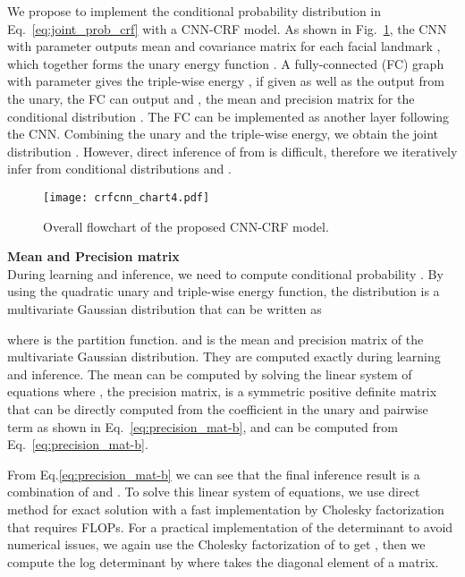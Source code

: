 \documentclass{article}
\begin{document}
We propose to implement the conditional probability distribution in Eq.~\eqref{eq:joint_prob_crf} with a CNN-CRF model. As shown in Fig.~\ref{fig:flowchart}, the CNN with parameter  outputs mean  and covariance matrix  for each facial landmark , which together forms the unary energy function . A fully-connected (FC) graph with parameter  gives the triple-wise energy , if given  as well as the output from the unary, the FC can output  and , the mean and precision matrix for the conditional distribution . The FC can be implemented as another layer following the CNN. Combining the unary and the triple-wise energy, we obtain the joint distribution . However, direct inference of  from  is difficult, therefore we iteratively infer from conditional distributions  and .
  \begin{figure}[ht]
    \begin{center}
       \texttt{[image: crfcnn\_chart4.pdf]}
    \end{center}
    \caption{Overall flowchart of the proposed CNN-CRF model.}
    \label{fig:flowchart}
  \end{figure} 

\textbf{Mean and Precision matrix}\\ During learning and inference, we need to compute conditional probability .
By using the quadratic unary and triple-wise energy function, the distribution  is a multivariate Gaussian distribution that can be written as

where  is the partition function.  and  is the mean and precision matrix of the multivariate Gaussian distribution. They are computed exactly during learning and inference.
The mean  can be computed by solving the linear system of equations  where , the precision matrix, is a symmetric positive definite matrix that can be directly computed from the coefficient in the unary and pairwise term as shown in Eq.~\eqref{eq:precision_mat-b}, and  can be computed from Eq.~\eqref{eq:precision_mat-b}.


\begingroup
\small

\endgroup




From Eq.\eqref{eq:precision_mat-b} we can see that the final inference result  is a combination of  and . To solve this linear system of equations, we use direct method for exact solution with a fast implementation by Cholesky factorization that requires  FLOPs. For a practical implementation of the determinant to avoid numerical issues, we again use the Cholesky factorization of  to get , then we compute the log determinant by  where  takes the diagonal element of a matrix.
\end{document}
